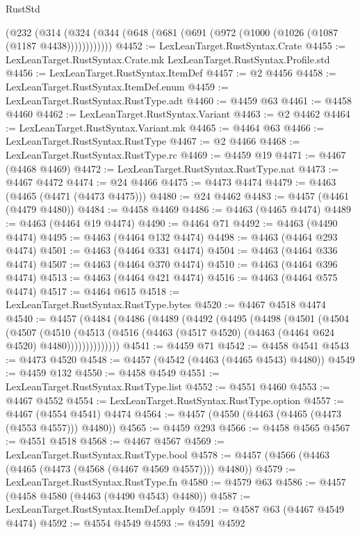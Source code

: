 \begin{lexlean}{RustStd}
\begin{coremodule}
    (@232 (@314 (@324 (@344 (@648 (@681 (@691 (@972 (@1000 (@1026 (@1087 (@1187 @4438))))))))))))
@4452 := LexLeanTarget.RustSyntax.Crate
@4455 := LexLeanTarget.RustSyntax.Crate.mk LexLeanTarget.RustSyntax.Profile.std
@4456 := LexLeanTarget.RustSyntax.ItemDef
@4457 := @2 @4456
@4458 := LexLeanTarget.RustSyntax.ItemDef.enum
@4459 := LexLeanTarget.RustSyntax.RustType.adt
@4460 := @4459 @63
@4461 := @4458 @4460
@4462 := LexLeanTarget.RustSyntax.Variant
@4463 := @2 @4462
@4464 := LexLeanTarget.RustSyntax.Variant.mk
@4465 := @4464 @63
@4466 := LexLeanTarget.RustSyntax.RustType
@4467 := @2 @4466
@4468 := LexLeanTarget.RustSyntax.RustType.rc
@4469 := @4459 @19
@4471 := @4467 (@4468 @4469)
@4472 := LexLeanTarget.RustSyntax.RustType.nat
@4473 := @4467 @4472
@4474 := @24 @4466
@4475 := @4473 @4474
@4479 := @4463 (@4465 (@4471 (@4473 @4475)))
@4480 := @24 @4462
@4483 := @4457 (@4461 (@4479 @4480))
@4484 := @4458 @4469
@4486 := @4463 (@4465 @4474)
@4489 := @4463 (@4464 @19 @4474)
@4490 := @4464 @71
@4492 := @4463 (@4490 @4474)
@4495 := @4463 (@4464 @132 @4474)
@4498 := @4463 (@4464 @293 @4474)
@4501 := @4463 (@4464 @331 @4474)
@4504 := @4463 (@4464 @336 @4474)
@4507 := @4463 (@4464 @370 @4474)
@4510 := @4463 (@4464 @396 @4474)
@4513 := @4463 (@4464 @421 @4474)
@4516 := @4463 (@4464 @575 @4474)
@4517 := @4464 @615
@4518 := LexLeanTarget.RustSyntax.RustType.bytes
@4520 := @4467 @4518 @4474
@4540 := @4457
    (@4484
      (@4486
        (@4489
          (@4492
            (@4495
              (@4498
                (@4501
                  (@4504
                    (@4507
                      (@4510
                        (@4513
                          (@4516 (@4463 (@4517 @4520) (@4463 (@4464 @624 @4520) @4480))))))))))))))
@4541 := @4459 @71
@4542 := @4458 @4541
@4543 := @4473 @4520
@4548 := @4457 (@4542 (@4463 (@4465 @4543) @4480))
@4549 := @4459 @132
@4550 := @4458 @4549
@4551 := LexLeanTarget.RustSyntax.RustType.list
@4552 := @4551 @4460
@4553 := @4467 @4552
@4554 := LexLeanTarget.RustSyntax.RustType.option
@4557 := @4467 (@4554 @4541) @4474
@4564 := @4457 (@4550 (@4463 (@4465 (@4473 (@4553 @4557))) @4480))
@4565 := @4459 @293
@4566 := @4458 @4565
@4567 := @4551 @4518
@4568 := @4467 @4567
@4569 := LexLeanTarget.RustSyntax.RustType.bool
@4578 := @4457 (@4566 (@4463 (@4465 (@4473 (@4568 (@4467 @4569 @4557)))) @4480))
@4579 := LexLeanTarget.RustSyntax.RustType.fn
@4580 := @4579 @63
@4586 := @4457 (@4458 @4580 (@4463 (@4490 @4543) @4480))
@4587 := LexLeanTarget.RustSyntax.ItemDef.apply
@4591 := @4587 @63 (@4467 @4549 @4474)
@4592 := @4554 @4549
@4593 := @4591 @4592

\end{coremodule}
\end{lexlean}
